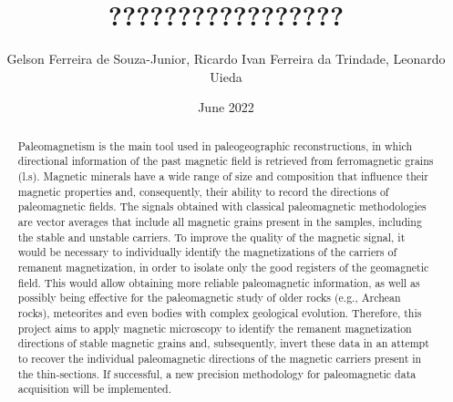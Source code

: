 \documentclass[manuscript,revised]{geophysics}
\begin{document}
\title{?????????????????}
\renewcommand{\thefootnote}{\fnsymbol{footnote}} 

\address{
\footnotemark[1]BP UTG, \\
200 Westlake Park Blvd, \\
Houston, TX, 77079 \\
\footnotemark[2]Bureau of Economic Geology, \\
John A. and Katherine G. Jackson School of Geosciences \\
The University of Texas at Austin \\
University Station, Box X \\
Austin, TX 78713-8924}

\author{Gelson Ferreira de Souza-Junior\footnotemark[1], Ricardo Ivan Ferreira da Trindade\footnotemark[1],  Leonardo Uieda\footnotemark[2]}
\date{June 2022}

\maketitle
\justify

\begin{abstract}
\begin{singlespace}
Paleomagnetism is the main tool used in paleogeographic reconstructions, in which directional information of the past magnetic field is retrieved from ferromagnetic grains (l.s). Magnetic minerals have a wide range of size and composition that influence their magnetic properties and, consequently, their ability to record the directions of paleomagnetic fields. The signals obtained with classical paleomagnetic methodologies are vector averages that include all magnetic grains present in the samples, including the stable and unstable carriers. To improve the quality of the magnetic signal, it would be necessary to individually identify the magnetizations of the carriers of remanent magnetization, in order to isolate only the good registers of the geomagnetic field. This would allow obtaining more reliable paleomagnetic information, as well as possibly being effective for the paleomagnetic study of older rocks (e.g., Archean rocks), meteorites and even bodies with complex geological evolution. Therefore, this project aims to apply magnetic microscopy to identify the remanent magnetization directions of stable magnetic grains and, subsequently, invert these data in an attempt to recover the individual paleomagnetic directions of the magnetic carriers present in the thin-sections. If successful, a new precision methodology for paleomagnetic data acquisition will be implemented.

\end{singlespace}
\end{abstract}
\end{document}
